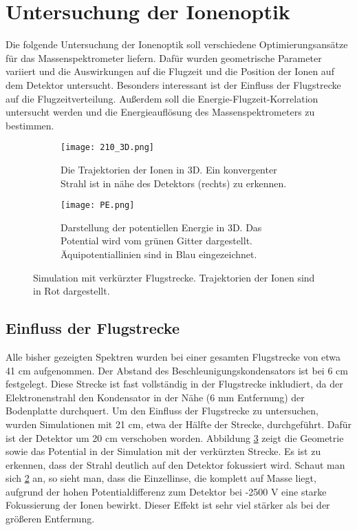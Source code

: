 \section{Untersuchung der Ionenoptik}
Die folgende Untersuchung der Ionenoptik soll verschiedene Optimierungsansätze für das Massenspektrometer liefern. Dafür wurden geometrische Parameter variiert und die Auswirkungen auf die Flugzeit und die Position der Ionen auf dem Detektor untersucht. Besonders interessant ist der Einfluss der Flugstrecke auf die Flugzeitverteilung. Außerdem soll die Energie-Flugzeit-Korrelation untersucht werden und die Energieauflösung des Massenspektrometers zu bestimmen.

\begin{figure}
    \centering
    \begin{subfigure}{.9\textwidth}
        \centering
        \texttt{[image: 210\_3D.png]}
        \caption{Die Trajektorien der Ionen in 3D. Ein konvergenter Strahl ist in nähe des Detektors (rechts) zu erkennen.}
        \label{fig:210}
    \end{subfigure}%
    \vfill
    \begin{subfigure}{.9\textwidth}
        \centering
        \texttt{[image: PE.png]}
        \caption{Darstellung der potentiellen Energie in 3D. Das Potential wird vom grünen Gitter dargestellt. Äquipotentiallinien sind in Blau eingezeichnet.}
        \label{fig:PE}
    \end{subfigure}
    \caption[Simulation mit verkürzter Flugstrecke]{Simulation mit verkürzter Flugstrecke. Trajektorien der Ionen sind in Rot dargestellt.}
    \label{fig:210_PE}
\end{figure}

\subsection{Einfluss der Flugstrecke}
Alle bisher gezeigten Spektren wurden bei einer gesamten Flugstrecke von etwa 41 cm aufgenommen. Der Abstand des Beschleunigungskondensators ist bei 6 cm festgelegt. Diese Strecke ist fast vollständig in der Flugstrecke inkludiert, da der Elektronenstrahl den Kondensator in der Nähe (6 mm Entfernung) der Bodenplatte durchquert. Um den Einfluss der Flugstrecke zu untersuchen, wurden Simulationen mit 21 cm, etwa der Hälfte der Strecke, durchgeführt. Dafür ist der Detektor um 20 cm verschoben worden. Abbildung \ref{fig:210_PE} zeigt die Geometrie sowie das Potential in der Simulation mit der verkürzten Strecke. Es ist zu erkennen, dass der Strahl deutlich auf den Detektor fokussiert wird. Schaut man sich \ref{fig:PE} an, so sieht man, dass die Einzellinse, die komplett auf Masse liegt, aufgrund der hohen Potentialdifferenz zum Detektor bei -2500 V eine starke Fokussierung der Ionen bewirkt. Dieser Effekt ist sehr viel stärker als bei der größeren Entfernung. 

